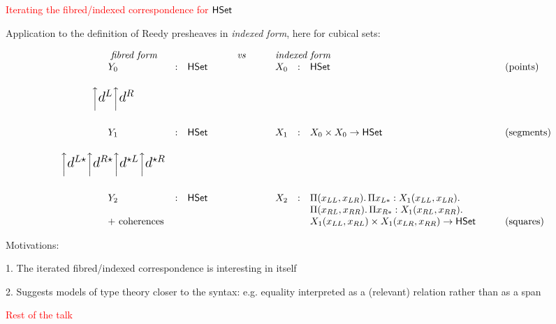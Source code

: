 \documentclass[12pt,landscape]{article}
\begin{document}
\begin{LARGE}
\begin{sf}
\newpage

\begin{center}
\textcolor{red}{\huge Iterating the fibred/indexed correspondence for $\mathsf{HSet}$}
\end{center}

\bigskip
\bigskip

\noindent Application to the definition of Reedy presheaves in \emph{indexed form}, here for cubical sets:

$$
\begin{array}{cllccllll}
\multicolumn{3}{c}{\mbox{\emph{fibred form}}} & \qquad\mathit{vs}\qquad & \multicolumn{3}{l}{\mbox{\emph{indexed form}}} \\
Y_0 &:& \HSet{l} & & X_0 & : & \HSet{l} & \mbox{(points)}\\[5mm]
\bigg\uparrow {\mbox{\Large $d^L$}}\bigg\uparrow{\mbox{\Large $d^R$}}\\[8mm]
Y_1 &:& \HSet{l} & & X_1 & : & X_0 \times X_0 \rightarrow \HSet{l} & \mbox{(segments)}\\[5mm]
\bigg\uparrow{\mbox{\Large $d^{L\star}$}}\bigg\uparrow{\mbox{\Large $d^{R\star}$}}\bigg\uparrow{\mbox{\Large $d^{\star L}$}}\bigg\uparrow{\mbox{\Large $d^{\star R}$}} \\[8mm]
Y_2 &:& \HSet{l} & & X_2 & : & \Pi (x_{LL},x_{LR}).\, \Pi x_{L*}:X_1 (x_{LL},x_{LR}).\\
& & & & & & \Pi (x_{RL},x_{RR}).\, \Pi x_{R*}:X_1 (x_{RL},x_{RR}).\, \\
\multicolumn{3}{c}{\mbox{~+ coherences}} & & & & X_1 (x_{LL},x_{RL}) \times X_1 (x_{LR},x_{RR}) \rightarrow \HSet{l} \qquad & \mbox{(squares)}\\
\end{array}
$$

Motivations:

1. The iterated fibred/indexed correspondence is interesting in itself

2. Suggests models of type theory closer to the syntax: e.g. equality
interpreted as a (relevant) relation rather than as a span

\newpage

\begin{center}
\textcolor{red}{\huge Rest of the talk}
\end{center}


\end{sf}
\end{LARGE}
\end{document}
